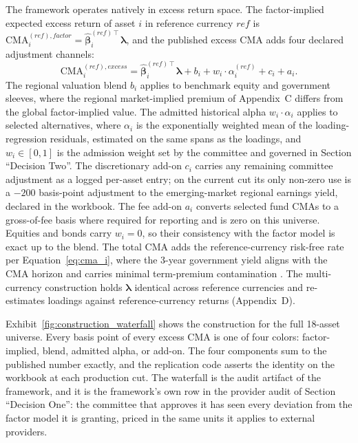 \documentclass[pdftex,12pt,a4paper]{article}
\begin{document}
The framework operates natively in excess return space. The factor-implied expected excess return of asset $i$ in reference currency $ref$ is $\text{CMA}_i^{(ref),factor} = \hat{\boldsymbol\beta}_i^{(ref)\intercal} \boldsymbol\lambda$, and the published excess CMA adds four declared adjustment channels:
\begin{equation}\label{eq:cma2a}
	\text{CMA}_i^{(ref),excess} = \hat{\boldsymbol\beta}_i^{(ref)\intercal} \boldsymbol\lambda + b_i + w_i \cdot \alpha_i^{(ref)} + c_i + a_i .
\end{equation}
The regional valuation blend $b_i$ applies to benchmark equity and government sleeves, where the regional market-implied premium of Appendix~C differs from the global factor-implied value. The admitted historical alpha $w_i \cdot \alpha_i$ applies to selected alternatives, where $\alpha_i$ is the exponentially weighted mean of the loading-regression residuals, estimated on the same spans as the loadings, and $w_i \in [0,1]$ is the admission weight set by the committee and governed in Section ``Decision Two''. The discretionary add-on $c_i$ carries any remaining committee adjustment as a logged per-asset entry; on the current cut its only non-zero use is a $-200$ basis-point adjustment to the emerging-market regional earnings yield, declared in the workbook.
The fee add-on $a_i$ converts selected fund CMAs to a gross-of-fee basis where required for reporting and is zero on this universe. Equities and bonds carry $w_i = 0$, so their consistency with the factor model is exact up to the blend. The total CMA adds the reference-currency risk-free rate per Equation~\eqref{eq:cma_i}, where the 3-year government yield aligns with the CMA horizon and carries minimal term-premium contamination \citep{ACM2013}. The multi-currency construction holds $\boldsymbol\lambda$ identical across reference currencies and re-estimates loadings against reference-currency returns (Appendix~D).

Exhibit~\ref{fig:construction_waterfall} shows the construction for the full 18-asset universe. Every basis point of every excess CMA is one of four colors: factor-implied, blend, admitted alpha, or add-on. The four components sum to the published number exactly, and the replication code asserts the identity on the workbook at each production cut. The waterfall is the audit artifact of the framework, and it is the framework's own row in the provider audit of Section ``Decision One'': the committee that approves it has seen every deviation from the factor model it is granting, priced in the same units it applies to external providers.
\end{document}
